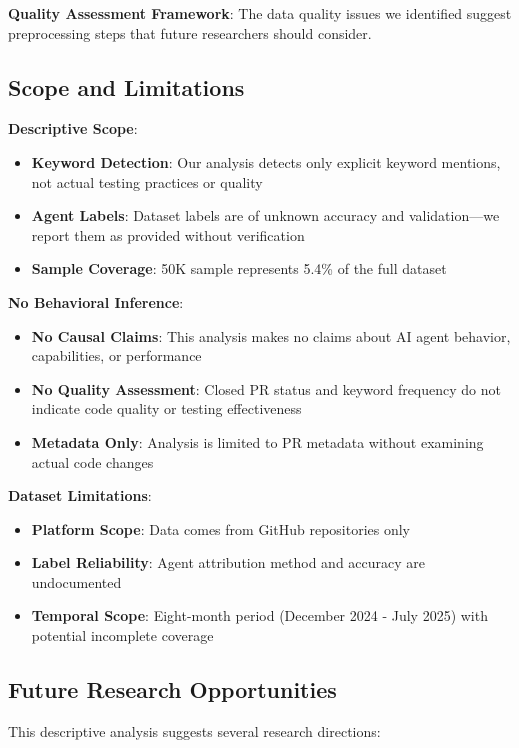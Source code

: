 \documentclass[conference]{IEEEtran}
\begin{document}
\textbf{Quality Assessment Framework}: The data quality issues we identified suggest preprocessing steps that future researchers should consider.

\subsection{Scope and Limitations}

\textbf{Descriptive Scope}:
\begin{itemize}
    \item \textbf{Keyword Detection}: Our analysis detects only explicit keyword mentions, not actual testing practices or quality
    \item \textbf{Agent Labels}: Dataset labels are of unknown accuracy and validation---we report them as provided without verification
    \item \textbf{Sample Coverage}: 50K sample represents 5.4\% of the full dataset
\end{itemize}

\textbf{No Behavioral Inference}:
\begin{itemize}
    \item \textbf{No Causal Claims}: This analysis makes no claims about AI agent behavior, capabilities, or performance
    \item \textbf{No Quality Assessment}: Closed PR status and keyword frequency do not indicate code quality or testing effectiveness
    \item \textbf{Metadata Only}: Analysis is limited to PR metadata without examining actual code changes
\end{itemize}

\textbf{Dataset Limitations}:
\begin{itemize}
    \item \textbf{Platform Scope}: Data comes from GitHub repositories only
    \item \textbf{Label Reliability}: Agent attribution method and accuracy are undocumented
    \item \textbf{Temporal Scope}: Eight-month period (December 2024 - July 2025) with potential incomplete coverage
\end{itemize}

\subsection{Future Research Opportunities}

This descriptive analysis suggests several research directions:
\end{document}
